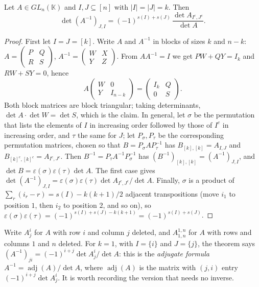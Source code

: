\begin{theorem}\label{linear:thm:jacobi}
Let $A\in GL_n(\mathbb K)$ and $I,J\subseteq[n]$ with $|I|=|J|=k$. Then
\[
\det(A^{-1})_{J,I}=(-1)^{s(I)+s(J)}\,\frac{\det A_{I^c,J^c}}{\det A}.
\]
\end{theorem}
\begin{proof}
First let $I=J=[k]$. Write $A$ and $A^{-1}$ in blocks of sizes $k$ and $n-k$:
$A=\begin{pmatrix}P&Q\\R&S\end{pmatrix}$, $A^{-1}=\begin{pmatrix}W&X\\Y&Z\end{pmatrix}$. From $AA^{-1}=I$ we get $PW+QY=I_k$ and
$RW+SY=0$, hence
\[
A\begin{pmatrix}W&0\\Y&I_{n-k}\end{pmatrix}=\begin{pmatrix}I_k&Q\\0&S\end{pmatrix}.
\]
Both block matrices are block triangular; taking determinants, $\det A\cdot\det W=\det S$, which is the claim. In
general, let $\sigma$ be the permutation that lists the elements of $I$ in increasing order followed by those of $I^c$
in increasing order, and $\tau$ the same for $J$; let $P_\sigma,P_\tau$ be the corresponding permutation matrices, chosen
so that $B=P_\sigma AP_\tau^{-1}$ has $B_{[k],[k]}=A_{I,J}$ and $B_{[k]^c,[k]^c}=A_{I^c,J^c}$. Then
$B^{-1}=P_\tau A^{-1}P_\sigma^{-1}$ has $(B^{-1})_{[k],[k]}=(A^{-1})_{J,I}$, and $\det B=\varepsilon(\sigma)\varepsilon(\tau)\det A$. The first
case gives $\det(A^{-1})_{J,I}=\varepsilon(\sigma)\varepsilon(\tau)\det A_{I^c,J^c}/\det A$. Finally, $\sigma$ is a product of
$\sum_r(i_r-r)=s(I)-k(k+1)/2$ adjacent transpositions (move $i_1$ to position $1$, then $i_2$ to position $2$, and so on),
so $\varepsilon(\sigma)\varepsilon(\tau)=(-1)^{s(I)+s(J)-k(k+1)}=(-1)^{s(I)+s(J)}$.
\end{proof}

Write $A^{i}_{j}$ for $A$ with row $i$ and column $j$ deleted, and $A^{1,n}_{1,n}$ for $A$ with rows and columns $1$
and $n$ deleted. For $k=1$, with $I=\{i\}$ and $J=\{j\}$, the theorem says $(A^{-1})_{ji}=(-1)^{i+j}\det A^{i}_{j}/\det A$:
this is the \emph{adjugate formula} $A^{-1}=\operatorname{adj}(A)/\det A$, where $\operatorname{adj}(A)$ is the matrix with
$(j,i)$ entry $(-1)^{i+j}\det A^{i}_{j}$. It is worth recording the version that needs no inverse.

